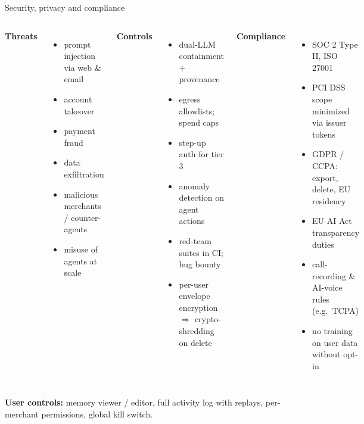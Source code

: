 \documentclass[aspectratio=169,10pt]{beamer}
\begin{document}
\begin{frame}{Security, privacy and compliance}
\begin{columns}[T]
\small
\textbf{Threats}
\begin{itemize}
  \item prompt injection via web \& email
  \item account takeover
  \item payment fraud
  \item data exfiltration
  \item malicious merchants / counter-agents
  \item misuse of agents at scale
\end{itemize}
\small
\textbf{Controls}
\begin{itemize}
  \item dual-LLM containment + provenance
  \item egress allowlists; spend caps
  \item step-up auth for tier 3
  \item anomaly detection on agent actions
  \item red-team suites in CI; bug bounty
  \item per-user envelope encryption $\Rightarrow$ crypto-shredding on delete
\end{itemize}
\small
\textbf{Compliance}
\begin{itemize}
  \item SOC 2 Type II, ISO 27001
  \item PCI DSS scope minimized via issuer tokens
  \item GDPR / CCPA: export, delete, EU residency
  \item EU AI Act transparency duties
  \item call-recording \& AI-voice rules (e.g.\ TCPA)
  \item no training on user data without opt-in
\end{itemize}
\end{columns}
\vfill
\small\textbf{User controls:} memory viewer / editor, full activity log with replays, per-merchant permissions, global kill switch.
\end{frame}
\end{document}
